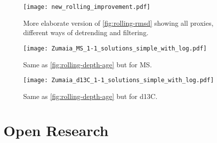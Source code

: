 \documentclass[draft]{agujournal2019}
\begin{document}
\begin{figure}[htb]
  \centering \texttt{[image: new\_rolling\_improvement.pdf]}
  \caption{\label{fig:rolling-rmsd-improvement}
    More elaborate version of \cref{fig:rolling-rmsd} showing all proxies, different ways of detrending and filtering.}
\end{figure}


\begin{figure}[htb]
  \centering
  \texttt{[image: Zumaia\_MS\_1-1\_solutions\_simple\_with\_log.pdf]}
  \caption{\label{fig:rolling-age-MS}
    Same as \cref{fig:rolling-depth-age} but for \gls{MS}.}
\end{figure}

\begin{figure}[htb]
  \centering
  \texttt{[image: Zumaia\_d13C\_1-1\_solutions\_simple\_with\_log.pdf]}
  \caption{\label{fig:rolling-age-d13C}
    Same as \cref{fig:rolling-depth-age} but for \gls{d13C}.}
\end{figure}

%
%

%

%



\section*{Open Research}
\end{document}

